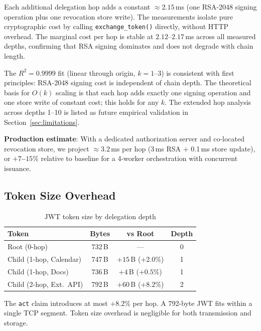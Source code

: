 \documentclass[journal]{IEEEtran}
\begin{document}
Each additional delegation hop adds a constant $\approx 2.15$\,ms (one RSA-2048
signing operation plus one revocation store write). The measurements isolate
pure cryptographic cost by calling \texttt{exchange\_token()} directly, without
HTTP overhead. The marginal cost per hop is stable at $2.12$--$2.17$\,ms across
all measured depths, confirming that RSA signing dominates and does not degrade
with chain length.

The $R^2 = 0.9999$ fit (linear through origin, $k = 1$--$3$) is consistent
with first principles: RSA-2048 signing cost is independent of chain depth.
The theoretical basis for $O(k)$ scaling is that each hop adds exactly one
signing operation and one store write of constant cost; this holds for any
$k$. The extended hop analysis across depths 1--10 is listed as future
empirical validation in Section~\ref{sec:limitations}.

\textbf{Production estimate}: With a dedicated authorization server and
co-located revocation store, we project $\approx 3.2$\,ms per hop (3\,ms RSA
$+$ 0.1\,ms store update), or \textbf{$+7$--$15\%$} relative to baseline for
a 4-worker orchestration with concurrent issuance.

\subsection{Token Size Overhead}

\begin{table}[h]
\caption{JWT token size by delegation depth}
\label{tab:tokensizes}
\centering
\footnotesize
\begin{tabular}{lccc}
\toprule
\textbf{Token} & \textbf{Bytes} & \textbf{vs Root} & \textbf{Depth} \\
\midrule
Root (0-hop)             & 732\,B & ---                    & 0 \\
Child (1-hop, Calendar)  & 747\,B & $+15$\,B ($+2.0\%$)   & 1 \\
Child (1-hop, Docs)      & 736\,B & $+4$\,B ($+0.5\%$)    & 1 \\
Child (2-hop, Ext.\ API) & 792\,B & $+60$\,B ($+8.2\%$)   & 2 \\
\bottomrule
\end{tabular}
\end{table}

The \texttt{act} claim introduces at most $+8.2\%$ per hop. A 792-byte JWT
fits within a single TCP segment. Token size overhead is negligible for both
transmission and storage.
\end{document}
